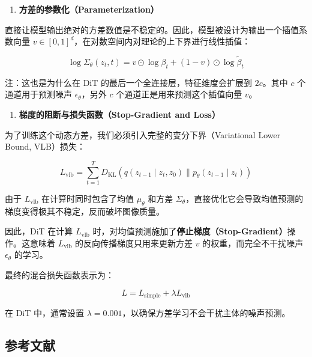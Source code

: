 \begin{enumerate}
\def\labelenumi{\arabic{enumi}.}
\tightlist
\item
  \textbf{方差的参数化（Parameterization）}
\end{enumerate}

直接让模型输出绝对的方差数值是不稳定的。因此，模型被设计为输出一个插值系数向量 \(v\in[0,1]^d\)，在对数空间内对理论的上下界进行线性插值：

\[
\log\Sigma_\theta(z_t,t)=v\odot\log\beta_t+(1-v)\odot\log\tilde{\beta}_t
\]

注：这也是为什么在 DiT 的最后一个全连接层，特征维度会扩展到 \(2c\)。其中 \(c\) 个通道用于预测噪声 \(\epsilon_\theta\)，另外 \(c\) 个通道正是用来预测这个插值向量 \(v\)。

\begin{enumerate}
\def\labelenumi{\arabic{enumi}.}
\setcounter{enumi}{1}
\tightlist
\item
  \textbf{梯度的阻断与损失函数（Stop-Gradient and Loss）}
\end{enumerate}

为了训练这个动态方差，我们必须引入完整的变分下界（Variational Lower Bound, VLB）损失：

\[
L_{\mathrm{vlb}}=\sum_{t=1}^{T}D_{\mathrm{KL}}\left(q(z_{t-1}\mid z_t,z_0)\parallel p_\theta(z_{t-1}\mid z_t)\right)
\]

由于 \(L_{\mathrm{vlb}}\) 在计算时同时包含了均值 \(\mu_\theta\) 和方差 \(\Sigma_\theta\)，直接优化它会导致均值预测的梯度变得极其不稳定，反而破坏图像质量。

因此，DiT 在计算 \(L_{\mathrm{vlb}}\) 时，对均值预测施加了\textbf{停止梯度（Stop-Gradient）}操作。这意味着 \(L_{\mathrm{vlb}}\) 的反向传播梯度只用来更新方差 \(v\) 的权重，而完全不干扰噪声 \(\epsilon_\theta\) 的学习。

最终的混合损失函数表示为：

\[
L=L_{\mathrm{simple}}+\lambda L_{\mathrm{vlb}}
\]

在 DiT 中，通常设置 \(\lambda=0.001\)，以确保方差学习不会干扰主体的噪声预测。

\hypertarget{ux53c2ux8003ux6587ux732e-131}{%
\subsection{参考文献}\label{ux53c2ux8003ux6587ux732e-131}}

